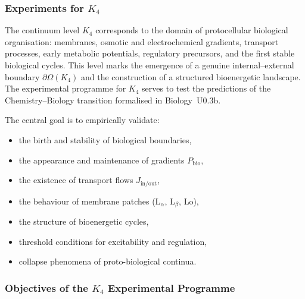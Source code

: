 
\subsubsection{Experiments for \texorpdfstring{$K_4$}{K_4}}
\label{sec:experiments-k4}

The continuum level $K_4$ corresponds to the domain of protocellular
biological organisation: membranes, osmotic and electrochemical 
gradients, transport processes, early metabolic potentials, 
regulatory precursors, and the first stable biological cycles.  
This level marks the emergence of a genuine internal–external 
boundary $\partial\Omega(K_4)$ and the construction of a structured 
bioenergetic landscape.  
The experimental programme for $K_4$ serves to test the 
predictions of the Chemistry--Biology transition formalised in 
Biology~U0.3b.

The central goal is to empirically validate:

\begin{itemize}
    \item the birth and stability of biological boundaries,
    \item the appearance and maintenance of gradients $P_{\mathrm{bio}}$,
    \item the existence of transport flows $J_{\mathrm{in/out}}$,
    \item the behaviour of membrane patches (L$_\alpha$, L$_\beta$, Lo),
    \item the structure of bioenergetic cycles,
    \item threshold conditions for excitability and regulation,
    \item collapse phenomena of proto-biological continua.
\end{itemize}



\subsubsection{Objectives of the \texorpdfstring{$K_4$}{K_4} Experimental Programme}

